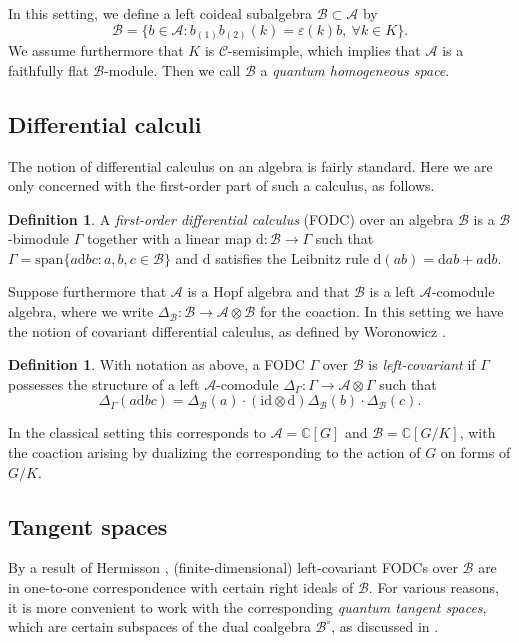 \documentclass[a4paper, 12pt, reqno, english]{amsart}
\numberwithin{equation}{section}
\numberwithin{figure}{section}
\theoremstyle{plain}
\theoremstyle{plain}
\theoremstyle{plain}
\theoremstyle{plain}
\theoremstyle{plain}
\theoremstyle{definition}
\newtheorem{definition}[theorem]{Definition}
\theoremstyle{definition}
\theoremstyle{definition}
\theoremstyle{remark}
\theoremstyle{definition}
\theoremstyle{definition}
\newcommand{\id}{\mathrm{id}}
\newcommand{\bbC}{\mathbb{C}}
\newcommand{\calA}{\mathcal{A}}
\newcommand{\calB}{\mathcal{B}}
\newcommand{\calC}{\mathcal{C}}
\newcommand{\lspan}{\mathrm{span}}
\newcommand{\diff}{\mathrm{d}}
\begin{document}
In this setting, we define a left coideal subalgebra $\calB \subset \calA$ by
\[
\calB = \{ b \in \calA : b_{(1)} b_{(2)}(k) = \varepsilon(k) b, \ \forall k \in K \}.
\]
We assume furthermore that $K$ is $\calC$-semisimple, which implies that $\calA$ is a faithfully flat $\calB$-module. Then we call $\calB$ a \emph{quantum homogeneous space}.

\subsection{Differential calculi}

The notion of differential calculus on an algebra is fairly standard.
Here we are only concerned with the first-order part of such a calculus, as follows.

\begin{definition}
A \emph{first-order differential calculus} (FODC) over an algebra $\calB$ is a $\calB$-bimodule $\Gamma$ together with a linear map $\diff: \calB \to \Gamma$ such that $\Gamma = \lspan \{ a \diff b c : a, b, c \in \calB \}$ and $\diff$ satisfies the Leibnitz rule $\diff(a b) = \diff a b + a \diff b$.
\end{definition}

Suppose furthermore that $\calA$ is a Hopf algebra and that $\calB$ is a left $\calA$-comodule algebra, where we write $\Delta_{\calB}: \calB \to \calA \otimes \calB$ for the coaction.
In this setting we have the notion of covariant differential calculus, as defined by Woronowicz \cite{woronowicz}.

\begin{definition}
With notation as above, a FODC $\Gamma$ over $\calB$ is \emph{left-covariant} if $\Gamma$ possesses the structure of a left $\calA$-comodule $\Delta_\Gamma: \Gamma \to \calA \otimes \Gamma$ such that
\[
\Delta_\Gamma(a \diff b c) = \Delta_{\calB}(a) \cdot (\id \otimes \diff) \Delta_{\calB}(b) \cdot \Delta_{\calB}(c).
\]
\end{definition}

In the classical setting this corresponds to $\calA = \bbC[G]$ and $\calB = \bbC[G / K]$, with the coaction arising by dualizing the corresponding to the action of $G$ on forms of $G / K$.

\subsection{Tangent spaces}

By a result of Hermisson \cite{hermisson}, (finite-dimensional) left-covariant FODCs over $\calB$ are in one-to-one correspondence with certain right ideals of $\calB$.
For various reasons, it is more convenient to work with the corresponding \emph{quantum tangent spaces}, which are certain subspaces of the dual coalgebra $\calB^\circ$, as discussed in \cite[Section 4]{heko-homogeneous}.
\end{document}
